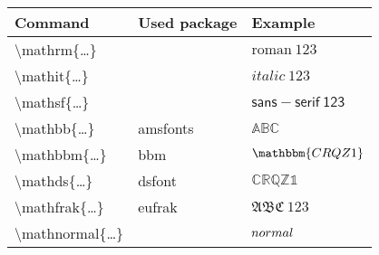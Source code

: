 \documentclass{article}
\renewcommand*\c{\textbackslash\ttfamily}
\begin{document}
\sffamily
\begin{tabular}{lll}
\toprule
\textbf{Command} & \textbf{Used package} & \textbf{Example} \\
\midrule
\c mathrm\{\ldots\}     &          & \(\mathrm{roman\ 123}\) \\
\c mathit\{\ldots\}     &          & \(\mathit{italic\ 123}\) \\
\c mathsf\{\ldots\}     &          & \(\mathsf{sans-serif\ 123}\) \\
\c mathbb\{\ldots\}     & amsfonts & \(\mathbb{ABC}\)  \\
\c mathbbm\{\ldots\}    & bbm      & \(\mathbbm{C R Q Z 1}\)  \\
\c mathds\{\ldots\}     & dsfont   &\(\mathds{C R Q Z 1}\)  \\
\c mathfrak\{\ldots\}   & eufrak   & \(\mathfrak{A B C \ 1 2 3}\)  \\
\c mathnormal\{\ldots\} &          & \(\mathnormal{normal}\)  \\
\bottomrule
\end{tabular}
\end{document}
